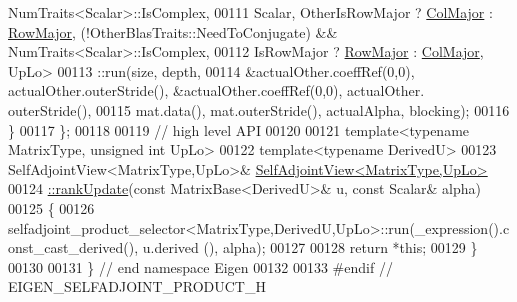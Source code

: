 \begin{DoxyCode}
       NumTraits<Scalar>::IsComplex,
00111       Scalar, OtherIsRowMajor ? \hyperlink{group__enums_ggaacded1a18ae58b0f554751f6cdf9eb13a0cbd4bdd0abcfc0224c5fcb5e4f6669a}{ColMajor} : \hyperlink{group__enums_ggaacded1a18ae58b0f554751f6cdf9eb13acfcde9cd8677c5f7caf6bd603666aae3}{RowMajor}, (!OtherBlasTraits::NeedToConjugate) &&
       NumTraits<Scalar>::IsComplex,
00112       IsRowMajor ? \hyperlink{group__enums_ggaacded1a18ae58b0f554751f6cdf9eb13acfcde9cd8677c5f7caf6bd603666aae3}{RowMajor} : \hyperlink{group__enums_ggaacded1a18ae58b0f554751f6cdf9eb13a0cbd4bdd0abcfc0224c5fcb5e4f6669a}{ColMajor}, UpLo>
00113       ::run(size, depth,
00114             &actualOther.coeffRef(0,0), actualOther.outerStride(), &actualOther.coeffRef(0,0), actualOther.
      outerStride(),
00115             mat.data(), mat.outerStride(), actualAlpha, blocking);
00116   \}
00117 \};
00118 
00119 \textcolor{comment}{// high level API}
00120 
00121 \textcolor{keyword}{template}<\textcolor{keyword}{typename} MatrixType, \textcolor{keywordtype}{unsigned} \textcolor{keywordtype}{int} UpLo>
00122 \textcolor{keyword}{template}<\textcolor{keyword}{typename} DerivedU>
00123 SelfAdjointView<MatrixType,UpLo>& \hyperlink{group___core___module_a4739585861baa13b25dcce5ed6658311}{SelfAdjointView<MatrixType,UpLo>}
00124 \hyperlink{group___core___module_a4739585861baa13b25dcce5ed6658311}{::rankUpdate}(\textcolor{keyword}{const} MatrixBase<DerivedU>& u, \textcolor{keyword}{const} Scalar& alpha)
00125 \{
00126   selfadjoint\_product\_selector<MatrixType,DerivedU,UpLo>::run(\_expression().const\_cast\_derived(), u.derived
      (), alpha);
00127 
00128   \textcolor{keywordflow}{return} *\textcolor{keyword}{this};
00129 \}
00130 
00131 \} \textcolor{comment}{// end namespace Eigen}
00132 
00133 \textcolor{preprocessor}{#endif // EIGEN\_SELFADJOINT\_PRODUCT\_H}
\end{DoxyCode}
